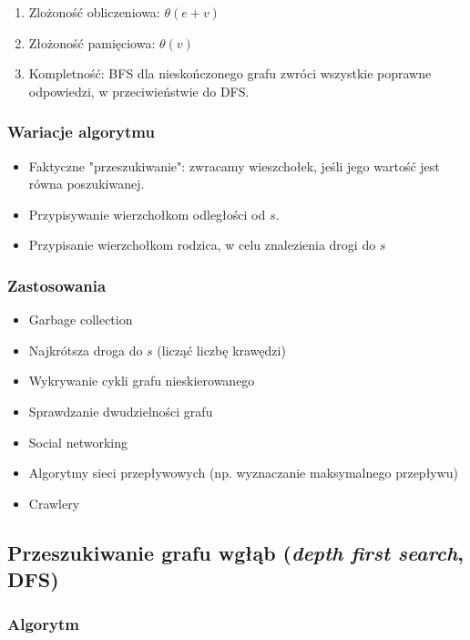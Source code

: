 \documentclass[main.tex]{subfiles}
\begin{document}
    \begin{enumerate}
        \item Zlożoność obliczeniowa: $\theta(e + v)$
        \item Złożoność pamięciowa: $\theta(v)$
        \item Kompletność: BFS dla nieskończonego grafu zwróci wszystkie poprawne
        odpowiedzi, w przeciwieństwie do DFS.
    \end{enumerate}

    \subsubsection{Wariacje algorytmu}

    \begin{itemize}
        \item Faktyczne "przeszukiwanie": zwracamy wieszchołek, jeśli jego wartość jest
        równa poszukiwanej.
        \item Przypisywanie wierzchołkom odległości od $s$.
        \item Przypisanie wierzchołkom rodzica, w celu znalezienia drogi do $s$
    \end{itemize}

    \subsubsection{Zastosowania}

    \begin{itemize}
        \item Garbage collection
        \item Najkrótsza droga do $s$ (licząć liczbę krawędzi)
        \item Wykrywanie cykli grafu nieskierowanego
        \item Sprawdzanie dwudzielności grafu
        \item Social networking
        \item Algorytmy sieci przepływowych (np. wyznaczanie maksymalnego przepływu)
        \item Crawlery
    \end{itemize}

    \subsection{Przeszukiwanie grafu wgłąb (\textit{depth first search}, DFS)}

    \subsubsection{Algorytm}
\end{document}
